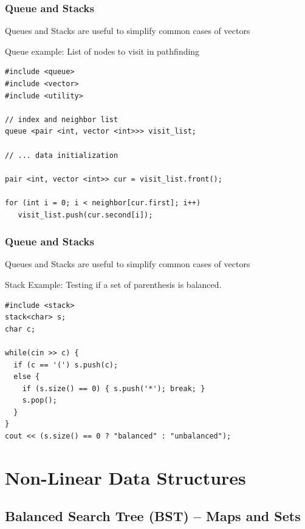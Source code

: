 \documentclass{beamer}
\begin{document}
\begin{frame}[fragile]
  \frametitle{Queue and Stacks}

  \begin{block}{}
    Queues and Stacks are useful to simplify common cases of vectors
  \end{block}

  Queue example: List of nodes to visit in pathfinding
{\small
\begin{verbatim}
#include <queue>
#include <vector>
#include <utility>

// index and neighbor list
queue <pair <int, vector <int>>> visit_list;

// ... data initialization

pair <int, vector <int>> cur = visit_list.front();

for (int i = 0; i < neighbor[cur.first]; i++)
   visit_list.push(cur.second[i]);
\end{verbatim}
}
  
\end{frame}


\begin{frame}[fragile]
  \frametitle{Queue and Stacks}

  \begin{block}{}
    Queues and Stacks are useful to simplify common cases of vectors
  \end{block}

  Stack Example: Testing if a set of parenthesis is balanced.
{\small
\begin{verbatim}
#include <stack>
stack<char> s;
char c;

while(cin >> c) {
  if (c == '(') s.push(c);
  else { 
    if (s.size() == 0) { s.push('*'); break; }
    s.pop();
  }
}
cout << (s.size() == 0 ? "balanced" : "unbalanced");

\end{verbatim}}
\end{frame}


\section{Non-Linear Data Structures}
\subsection{Balanced Search Tree (BST) -- Maps and Sets}
\end{document}
